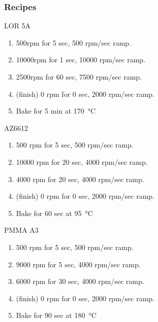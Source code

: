 \subsubsection{Recipes}
\begin{description}
\item {LOR 5A}
  \begin{enumerate}
  \item 500rpm for 5 sec, 500 rpm/sec ramp.
  \item 10000rpm for 1 sec, 10000 rpm/sec ramp.
  \item 2500rpm for 60 sec, 7500 rpm/sec ramp.
  \item (finish) 0 rpm for 0 sec, 2000 rpm/sec ramp.
  \item Bake for 5 min at \SI{170}{\celsius}
  \end{enumerate}
\item {AZ6612}
  \begin{enumerate}
  \item 500 rpm for 5 sec, 500 rpm/sec ramp.
  \item 10000 rpm for 20 sec, 4000 rpm/sec ramp.
  \item 4000 rpm for 20 sec, 4000 rpm/sec ramp.
  \item (finish) 0 rpm for 0 sec, 2000 rpm/sec ramp.
  \item Bake for 60 sec at \SI{95}{\celsius}
  \end{enumerate}
\item {PMMA A3}
  \begin{enumerate}
  \item 500 rpm for 5 sec, 500 rpm/sec ramp.
  \item 9000 rpm for 5 sec, 4000 rpm/sec ramp.
  \item 6000 rpm for 30 sec, 4000 rpm/sec ramp.
  \item (finish) 0 rpm for 0 sec, 2000 rpm/sec ramp.
  \item Bake for 90 sec at \SI{180}{\celsius}
  \end{enumerate}
\end{description}

